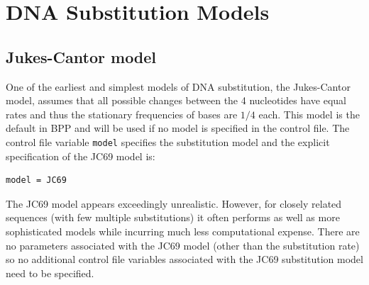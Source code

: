\documentclass[a4paper]{book}
\numberwithin{equation}{section} \renewcommand{\baselinestretch}{0.55}
\begin{document}
\newpage
\section{DNA Substitution Models}
\subsection{Jukes-Cantor model}
One of the earliest and simplest models of DNA substitution, the
Jukes-Cantor model, assumes that all possible changes
between the 4 nucleotides have equal rates and thus the stationary
frequencies of bases are $1/4$ each. This model is the default in BPP
and will be used if no model is specified in the control file. The
control file variable \texttt{model} specifies the substitution model
and the explicit specification of the JC69 model is:
\begin{verbatim}
model = JC69
\end{verbatim}
The JC69 model appears exceedingly unrealistic. However, for closely
related sequences (with few multiple substitutions) it often performs
as well as more sophisticated models while incurring much less
computational expense. There are no parameters associated with the
JC69 model (other than the substitution rate) so no additional control
file variables associated with the JC69 substitution model need to be
specified.
\end{document}
